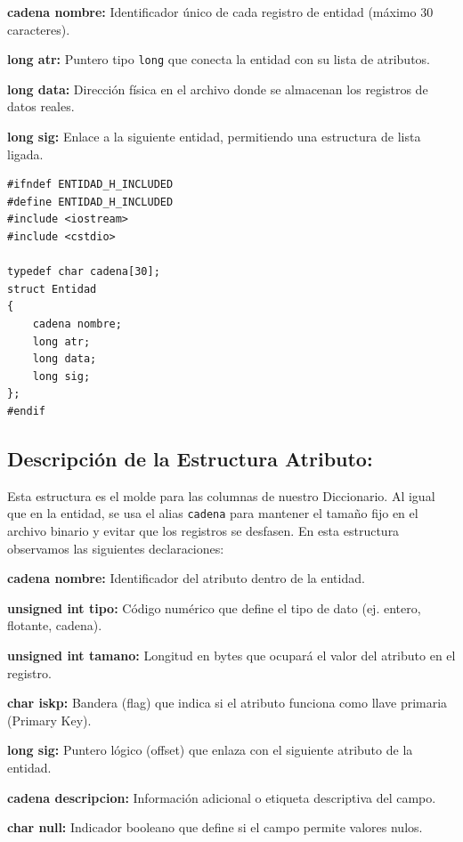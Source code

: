 \documentclass[12pt]{article}
\newcommand{\campo}[2]{
    \noindent\hangindent=1.2cm\makebox[0.6cm][l]{\color{MainBlue}\scriptsize$\bullet$} 
    \textbf{#1} #2 \par\vspace{0.1cm}
}
\begin{document}
\campo{cadena nombre:}{Identificador único de cada registro de entidad (máximo 30 caracteres).}
\campo{long atr:}{Puntero tipo \texttt{long} que conecta la entidad con su lista de atributos.}
\campo{long data:}{Dirección física en el archivo donde se almacenan los registros de datos reales.}
\campo{long sig:}{Enlace a la siguiente entidad, permitiendo una estructura de lista ligada.}

\bigskip

\begin{lstlisting}[caption=Estructura de Datos de Entidad, label=code:entidad]
#ifndef ENTIDAD_H_INCLUDED
#define ENTIDAD_H_INCLUDED
#include <iostream>
#include <cstdio>

typedef char cadena[30];
struct Entidad
{
    cadena nombre;
    long atr;
    long data;
    long sig;
};
#endif
\end{lstlisting}


\newpage

{}
\subsection*{Descripción de la Estructura Atributo:}

Esta estructura es el molde para las columnas de nuestro Diccionario. Al igual que en la entidad, se usa el alias \texttt{cadena} para mantener el tamaño fijo en el archivo binario y evitar que los registros se desfasen. En esta estructura observamos las siguientes declaraciones:

\campo{cadena nombre:}{Identificador del atributo dentro de la entidad.}
\campo{unsigned int tipo:}{Código numérico que define el tipo de dato (ej. entero, flotante, cadena).}
\campo{unsigned int tamano:}{Longitud en bytes que ocupará el valor del atributo en el registro.}
\campo{char iskp:}{Bandera (flag) que indica si el atributo funciona como llave primaria (Primary Key).}
\campo{long sig:}{Puntero lógico (offset) que enlaza con el siguiente atributo de la entidad.}
\campo{cadena descripcion:}{Información adicional o etiqueta descriptiva del campo.}
\campo{char null:}{Indicador booleano que define si el campo permite valores nulos.}
\end{document}
